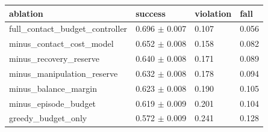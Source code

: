 \begin{tabular}{llll}
\toprule
ablation & success & violation & fall \\
\midrule
full\_contact\_budget\_controller & 0.696 $\pm$ 0.007 & 0.107 & 0.056 \\
minus\_contact\_cost\_model & 0.652 $\pm$ 0.008 & 0.158 & 0.082 \\
minus\_recovery\_reserve & 0.640 $\pm$ 0.008 & 0.171 & 0.089 \\
minus\_manipulation\_reserve & 0.632 $\pm$ 0.008 & 0.178 & 0.094 \\
minus\_balance\_margin & 0.623 $\pm$ 0.008 & 0.190 & 0.105 \\
minus\_episode\_budget & 0.619 $\pm$ 0.009 & 0.201 & 0.104 \\
greedy\_budget\_only & 0.572 $\pm$ 0.009 & 0.241 & 0.128 \\
\bottomrule
\end{tabular}
